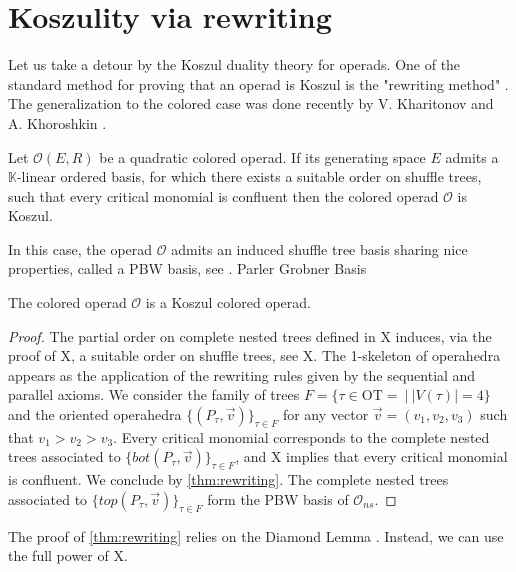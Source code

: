 
\section{Koszulity via rewriting} 
\label{s:rewriting}


Let us take a detour by the Koszul duality theory for operads. One of the standard method for proving that an operad is Koszul is the "rewriting method" \cite[Section 8.3]{LodayVallette12}. The generalization to the colored case was done recently by V. Kharitonov and A. Khoroshkin \cite[Theorem 3.12]{KhariKhoro20}.

\begin{thm} \label{thm:rewriting} Let $\mathcal{O}(E,R)$ be a quadratic colored operad. If its generating space $E$ admits a $\mathbb{K}$-linear ordered basis, for which there exists a suitable order on shuffle trees, such that every critical monomial is confluent then the colored operad $\mathcal{O}$ is Koszul. 
\end{thm}

In this case, the operad $\mathcal{O}$ admits an induced shuffle tree basis sharing nice properties, called a PBW basis, see \cite[Section 8.5.3]{LodayVallette12}. Parler Grobner Basis

\begin{thm} \label{thm:Koszulrewriting} The colored operad $\mathcal{O}$ is a Koszul colored operad. 
\end{thm}
\begin{proof} The partial order on complete nested trees defined in X induces, via the proof of X, a suitable order on shuffle trees, see X. The 1-skeleton of operahedra appears as the application of the rewriting rules given by the sequential and parallel axioms. We consider the family of trees $F=\{\tau \in \mathrm{OT}=\ | \ |V(\tau)|=4\}$ and the oriented operahedra $\{(P_\tau,\vec v)\}_{\tau \in F}$ for any vector $\vec v=(v_1,v_2,v_3)$ such that $v_1>v_2>v_3$. Every critical monomial corresponds to the complete nested trees associated to $\{bot(P_\tau,\vec v)\}_{\tau \in F}$, and X implies that every critical monomial is confluent. We conclude by \cref{thm:rewriting}. 
The complete nested trees associated to $\{top(P_\tau, \vec v)\}_{\tau \in F}$ form the PBW basis of $\mathcal{O}_{ns}$.
\end{proof}

The proof of \cref{thm:rewriting} relies on the Diamond Lemma \cite[Theorem 8.5.5]{LodayVallette12}. Instead, we can use the full power of X.

